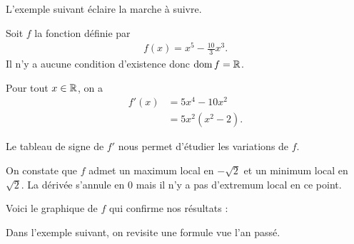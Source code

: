 \documentclass[main.tex]{subfiles}
\begin{document}
L'exemple suivant éclaire la marche à suivre.

\begin{example}
     Soit $f$ la fonction définie par
     \begin{align}
         f(x) = x^5 - \frac {10} 3 x^3.
     \end{align}
     Il n'y a aucune condition d'existence donc $\operatorname{dom} f = \mathbb{R}$.

     Pour tout $x \in \mathbb{R}$, on a
     \begin{align}
         f'(x)
         &= 5 x^4 - 10 x^2\\
         &= 5 x^2 (x^2 - 2).
     \end{align}

     Le tableau de signe de $f'$ nous permet d'étudier les variations de $f$.


    On constate que $f$ admet un maximum local en $- \sqrt 2$ et un minimum local en $ \sqrt 2$.
    La dérivée s'annule en $0$ mais il n'y a pas d'extremum local en ce point.

    Voici le graphique de $f$ qui confirme nos résultats :

    \begin{plot}{0.5}{-5}{-5}{5}{5}
    \end{plot}
\end{example}

Dans l'exemple suivant, on revisite une formule vue l'an passé.
\end{document}
